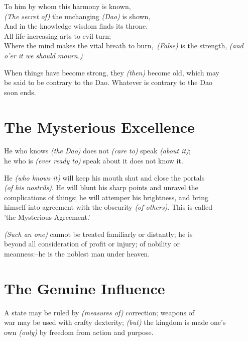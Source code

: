     To him by whom this harmony is known,\\
    \textit{(The secret of)} the unchanging \textit{(Dao)} is shown,\\
    And in the knowledge wisdom finds its throne.\\
    All life-increasing arts to evil turn;\\
    Where the mind makes the vital breath to burn,\
    \textit{(False)} is the strength, \textit{(and o'er it we should mourn.)}\vspace{\baselineskip}
    
    When things have become strong, they \textit{(then)} become old, which may\\
    be said to be contrary to the Dao. Whatever is contrary to the Dao\\
    soon ends.\vspace{\baselineskip}
    
\section*{The Mysterious Excellence}
    He who knows \textit{(the Dao)} does not \textit{(care to)} speak \textit{(about it)};\\
    he who is \textit{(ever ready to)} speak about it does not know it.\vspace{\baselineskip}
    
    He \textit{(who knows it)} will keep his mouth shut and close the portals\\
    \textit{(of his nostrils)}. He will blunt his sharp points and unravel the\\
    complications of things; he will attemper his brightness, and bring\\
    himself into agreement with the obscurity \textit{(of others)}. This is called\\
    'the Mysterious Agreement.'\vspace{\baselineskip}
    
    \textit{(Such an one)} cannot be treated familiarly or distantly; he is\\
    beyond all consideration of profit or injury; of nobility or\\
    meanness:--he is the noblest man under heaven.\vspace{\baselineskip}
\newpage{}
\section*{The Genuine Influence}
    A state may be ruled by \textit{(measures of)} correction; weapons of\\
    war may be used with crafty dexterity; \textit{(but)} the kingdom is made one's\\
    own \textit{(only)} by freedom from action and purpose.\vspace{\baselineskip}
    
